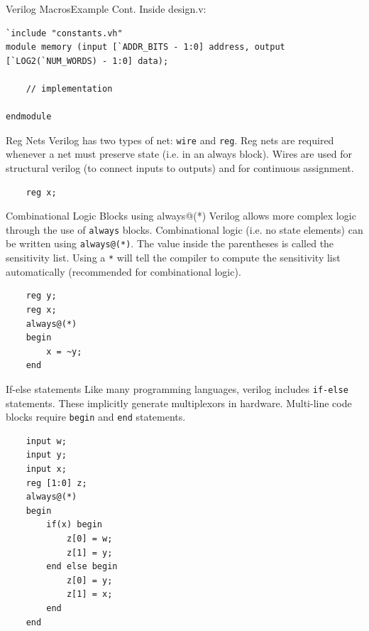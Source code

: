 \documentclass{beamer}
\begin{document}
\begin{frame}[fragile]{Verilog Macros}{Example Cont.}
Inside design.v:
\begin{verbatim}
`include "constants.vh"
module memory (input [`ADDR_BITS - 1:0] address, output [`LOG2(`NUM_WORDS) - 1:0] data);

	// implementation
	
endmodule
\end{verbatim}
\end{frame}

\begin{frame}[fragile]{Reg Nets}
	Verilog has two types of net: \texttt{wire} and \texttt{reg}.
	Reg nets are required whenever a net must preserve state (i.e. in an always block).
	Wires are used for structural verilog (to connect inputs to outputs) and for continuous assignment.

\begin{verbatim}
	reg x;
\end{verbatim}

\end{frame}

\begin{frame}[fragile]{Combinational Logic Blocks using always@(*)}
	Verilog allows more complex logic through the use of \texttt{always} blocks.
	Combinational logic (i.e. no state elements) can be written using \texttt{always@(*)}.
	The value inside the parentheses is called the sensitivity list.
	Using a \texttt{*} will tell the compiler to compute the sensitivity list automatically (recommended for combinational logic).

\begin{verbatim}
	reg y;
	reg x;
	always@(*)
	begin
		x = ~y;
	end
\end{verbatim}

\end{frame}

\begin{frame}[fragile]{If-else statements}
	Like many programming languages, verilog includes \texttt{if-else} statements.
	These implicitly generate multiplexors in hardware.
	Multi-line code blocks require \texttt{begin} and \texttt{end} statements.

\begin{verbatim}
	input w;
	input y;
	input x;
	reg [1:0] z;
	always@(*)
	begin
		if(x) begin
			z[0] = w;
			z[1] = y;
		end else begin
			z[0] = y;
			z[1] = x;
		end
	end
\end{verbatim}

\end{frame}
\end{document}
